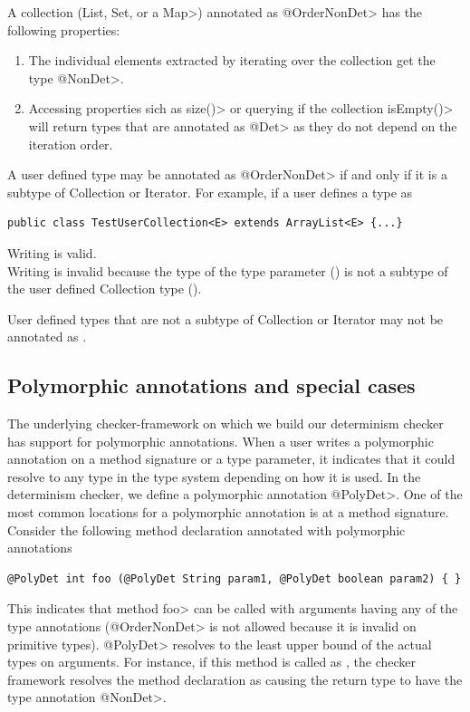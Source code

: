 A collection (\<List, Set, or a Map>) annotated as \<@OrderNonDet> has the following properties:
\begin{enumerate}
	\item The individual elements extracted by iterating over the collection get the type \<@NonDet>.
	\item Accessing properties sich as \<size()> or querying if the collection \<isEmpty()> will return types
	that are annotated as \<@Det> as they do not depend on the iteration order. 
\end{enumerate}

A user defined type may be annotated as \<@OrderNonDet> if and only if it
is a subtype of Collection or Iterator.
For example, if a user defines a type as
\begin{verbatim}
public class TestUserCollection<E> extends ArrayList<E> {...}
\end{verbatim}
Writing  is valid.\\
Writing  is invalid
because the type of the type parameter () is not a subtype
of the user defined Collection type ().

User defined types that are not a subtype of Collection or Iterator
may not be annotated as .

\subsection{Polymorphic annotations and special cases}
The underlying checker-framework on which we build our determinism checker has support for
polymorphic annotations. When a user writes a polymorphic annotation on a method signature or a type parameter,
it indicates that it could resolve to any type in the type system depending on how it is used.
In the determinism checker, we define a polymorphic annotation \<@PolyDet>.
One of the most common locations for a polymorphic annotation is at a method signature.
Consider the following method declaration annotated with polymorphic annotations
\begin{verbatim}
@PolyDet int foo (@PolyDet String param1, @PolyDet boolean param2) { }
\end{verbatim}
This indicates that method \<foo> can be called with arguments having any of the  type annotations 
(\<@OrderNonDet> is not allowed because it is invalid on primitive types). \<@PolyDet> resolves to the least upper bound of
the actual types on arguments. For instance, if this method is called as , the 
checker framework resolves the method declaration as 
causing the return type to have the type annotation \<@NonDet>. 

